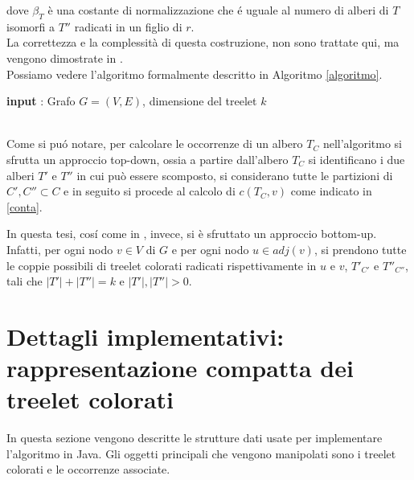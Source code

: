 dove $ \beta_T $ \`e una costante di normalizzazione che \'e uguale al numero di alberi di $ T $ isomorfi a $ T'' $ radicati in un figlio di $ r $.\\
 La correttezza e la complessit\`a di questa costruzione, non sono trattate qui, ma vengono dimostrate in \cite{alon1995color}.\\
 Possiamo vedere l'algoritmo formalmente  descritto in Algoritmo \ref{algoritmo}.\mbox{}\\


\begin{algorithm}[H]
	\label{algoritmo}
	\SetAlgoLined
	\caption{Fase di costruzione}
 	\textbf{input} : Grafo $ G =(V,E) $, dimensione del treelet $ k $ \;	
 			
\end{algorithm}\mbox{}\\

Come si pu\'o notare, per calcolare le occorrenze di un albero $ T_C $ nell'algoritmo si sfrutta un approccio top-down, ossia a partire dall'albero $ T_C $ si identificano i due alberi $ T' $ e $ T'' $ in cui pu\`o essere scomposto, si considerano tutte le partizioni di $ C',C'' \subset C $ e in seguito si procede al calcolo di $ c(T_C,v) $ come indicato in \eqref{conta}.

In questa tesi, cos\'i come in \cite{bressan2019motivo}, invece, si \`e sfruttato un approccio bottom-up. Infatti, per ogni nodo $ v \in V $ di $ G $ e per ogni nodo $ u \in adj(v)$, si prendono tutte le coppie possibili di treelet colorati radicati rispettivamente in $ u $ e $ v $, $ T'_{C'} $ e $ T''_{C''} $, tali che $ |T'| + |T''| = k $ e $ |T'|,|T''|>0 $.

\section{Dettagli implementativi: rappresentazione compatta dei treelet colorati}
\label{section 2}
In questa sezione vengono descritte le strutture dati usate per implementare l'algoritmo in Java.
Gli oggetti principali che vengono manipolati sono i treelet colorati e le occorrenze associate.

